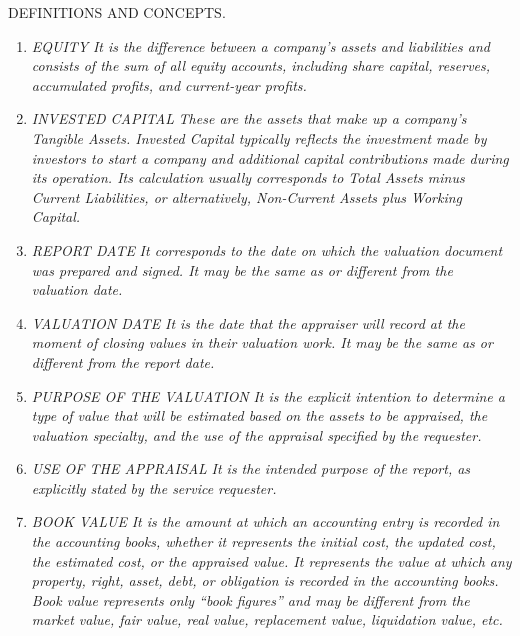 \textcolor{principal}{DEFINITIONS AND CONCEPTS.}

\begin{enumerate}

\item \textcolor{principal}{\textit{EQUITY}}
\textit{It is the difference between a company's assets and liabilities and consists of the sum of all equity accounts, including share capital, reserves, accumulated profits, and current-year profits.}

\item  \textcolor{principal}{\textit{INVESTED CAPITAL}}
\textit{These are the assets that make up a company's Tangible Assets. Invested Capital typically reflects the investment made by investors to start a company and additional capital contributions made during its operation. Its calculation usually corresponds to Total Assets minus Current Liabilities, or alternatively, Non-Current Assets plus Working Capital.}

\item \textcolor{principal}{\textit{REPORT DATE}}
\textit{It corresponds to the date on which the valuation document was prepared and signed. It may be the same as or different from the valuation date.}

\item \textcolor{principal}{\textit{VALUATION DATE}}
\textit{It is the date that the appraiser will record at the moment of closing values in their valuation work. It may be the same as or different from the report date.}

\item \textcolor{principal}{\textit{PURPOSE OF THE VALUATION}}
\textit{It is the explicit intention to determine a type of value that will be estimated based on the assets to be appraised, the valuation specialty, and the use of the appraisal specified by the requester.}

\item \textcolor{principal}{\textit{USE OF THE APPRAISAL}}
\textit{It is the intended purpose of the report, as explicitly stated by the service requester.}

\item \textcolor{principal}{\textit{BOOK VALUE}}
\textit{It is the amount at which an accounting entry is recorded in the accounting books, whether it represents the initial cost, the updated cost, the estimated cost, or the appraised value. It represents the value at which any property, right, asset, debt, or obligation is recorded in the accounting books. Book value represents only ``book figures'' and may be different from the market value, fair value, real value, replacement value, liquidation value, etc.}


\end{enumerate}
